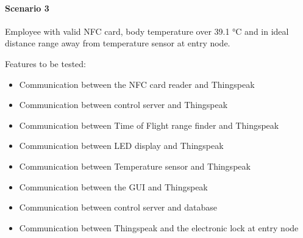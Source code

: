 \paragraph{Scenario 3}
Employee with valid NFC card, body temperature over 39.1 °C and in ideal
distance range away from temperature sensor at entry node.

\noindent
Features to be tested:
\begin{itemize}
    \item Communication between the NFC card reader and Thingspeak 
    \item Communication between control server and Thingspeak
    \item Communication between Time of Flight range finder and Thingspeak 
    \item Communication between LED display and Thingspeak 
    \item Communication between Temperature sensor and Thingspeak 
    \item  Communication between the GUI and Thingspeak
    \item Communication between control server and database
    \item Communication between Thingspeak and the electronic lock at entry node
\end{itemize}

